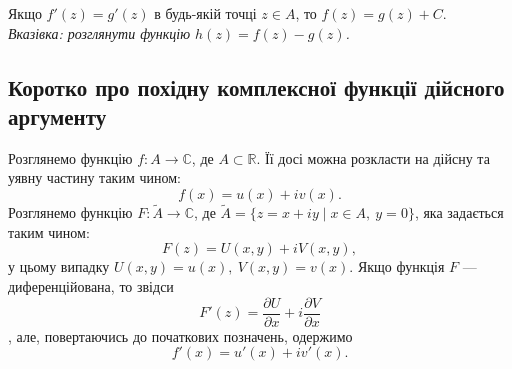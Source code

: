 \documentclass{math_library}
\begin{document}
\begin{corollary}
Якщо $f'(z)=g'(z)$ в будь-якій точці $z \in A$, то $f(z)=g(z)+C$.\\
\textit{Вказівка: розглянути функцію $h(z) = f(z)-g(z)$.}
\end{corollary}

\subsection{Коротко про похідну комплексної функції дійсного аргументу}
Розглянемо функцію $f \colon A \to \mathbb{C}$, де $A \subset \mathbb{R}$. Її досі можна розкласти на дійсну та уявну частину таким чином:
\[
f(x) = u(x) + iv(x).
\]
Розглянемо функцію $F \colon \tilde{A} \to \mathbb{C}$, де $\tilde{A} = \{ z = x + iy \mid x \in A,\ y = 0\}$, яка задається таким чином:
\[
F(z) = U(x,y) + i V(x,y),
\]
у цьому випадку $U(x,y) = u(x),\ V(x,y) = v(x)$. Якщо функція $F$ --- диференційована, то звідси
\[
F'(z) = \dfrac{\partial U}{\partial x} + i \dfrac{\partial V}{\partial x}
\],
але, повертаючись до початкових позначень, одержимо
\[
f'(x) = u'(x) + i v'(x).
\]
	
\end{document}

